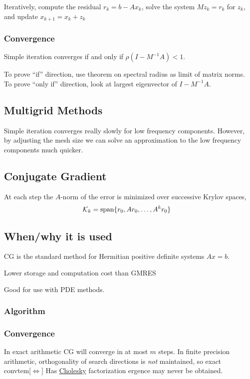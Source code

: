 \documentclass[12pt]{article}
\begin{document}
Iteratively, compute the residual \( r_k = b-Ax_k \), solve the system \( Mz_k = r_k \) for \( z_k \), and update \( x_{k+1} = x_{k} + z_{k}  \)

\subsubsection{Convergence}
Simple iteration converges if and only if \( \rho(I-M^{-1}A) < 1 \).

To prove ``if'' direction, use theorem on spectral radius as limit of matrix norms. To prove ``only if'' direction, look at largest eigenvector of \( I-M^{-1}A \).

\subsection{Multigrid Methods}
Simple iteration converges really slowly for low frequency components. However, by adjusting the mesh size we can solve an approximation to the low frequency components much quicker.


\subsection{Conjugate Gradient}
At each step the \( A \)-norm of the error is minimized over successive Krylov spaces,
\begin{align*}
    \mathcal{K}_k = \operatorname{span}\{ r_0, Ar_0, \ldots, A^k r_0 \}
\end{align*}

\subsection{When/why it is used}
CG is the standard method for Hermitian positive definite systems \( Ax = b \). 

Lower storage and computation cost than GMRES

Good for use with PDE methods.

\subsubsection{Algorithm}


\subsubsection{Convergence}
In exact arithmetic CG will converge in at most \( m \) steps. In finite precision arithmetic, orthogonality of search directions is \textit{not} maintained, so exact convtem[\(\Leftrightarrow\)] Has \hyperref[sec:cholesky]{Cholesky} factorization
ergence may never be obtained.
\end{document}
